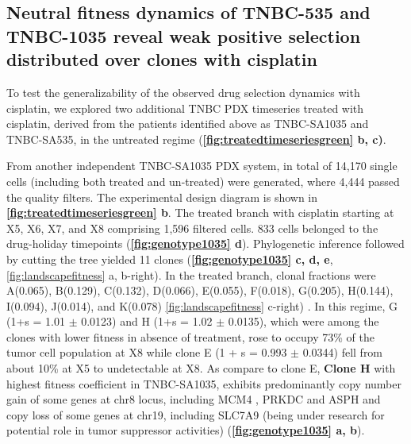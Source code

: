 
\subsection{Neutral fitness dynamics of TNBC-535 and TNBC-1035 reveal weak positive selection distributed over clones with cisplatin}
To test the generalizability of the observed drug selection dynamics with cisplatin, we explored two additional TNBC PDX timeseries treated with cisplatin, derived from the patients identified above as TNBC-SA1035 and TNBC-SA535, in the untreated regime  (\textbf{\autoref{fig:treatedtimeseriesgreen} b, c)}. 



From another independent TNBC-SA1035 PDX system, in total of 14,170 single cells (including both treated and un-treated) were generated, where 4,444 passed the quality filters. The experimental design diagram is shown in \textbf{\autoref{fig:treatedtimeseriesgreen} b}.
 The treated branch with cisplatin starting at X5, X6, X7, and X8 comprising 1,596 filtered cells. 833 cells belonged to the drug-holiday timepoints (\textbf{\autoref{fig:genotype1035} d}). Phylogenetic inference followed by cutting the tree yielded 11 clones (\textbf{\autoref{fig:genotype1035} c, d, e}, {\autoref{fig:landscapefitness} a, b-right}). In the treated branch, clonal fractions were A(0.065), B(0.129), C(0.132), D(0.066), E(0.055), F(0.018), G(0.205), H(0.144), I(0.094), J(0.014), and K(0.078) {\autoref{fig:landscapefitness} c-right}) . In this regime, G (1+s = 1.01 $\pm$ 0.0123) and H (1+s = 1.02 $\pm$ 0.0135), which were among the clones with lower fitness in absence of treatment, rose to occupy 73\% of the tumor cell population at X8 while clone E (1 + s = 0.993 $\pm$ 0.0344) fell from about 10\% at X5 to undetectable at X8. As compare to clone E,
 \textbf{Clone H} with highest fitness coefficient in TNBC-SA1035, exhibits predominantly copy number gain of some genes at chr8 locus, including MCM4 \cite {issac2019mcm2, stoeber2001dna, kwok2015prognostic}, PRKDC \cite {tan2020prkdc, sun2017prkdc, zhang2019prkdc} and ASPH and copy loss of some genes at chr19, including SLC7A9 (being under research for potential role in tumor suppressor activities) \cite {bhutia2016slc, ji2018function, broer2020amino, ganapathy2015slc5a8, gupta2006slc5a8} (\textbf{\autoref{fig:genotype1035} a, b}).
 
